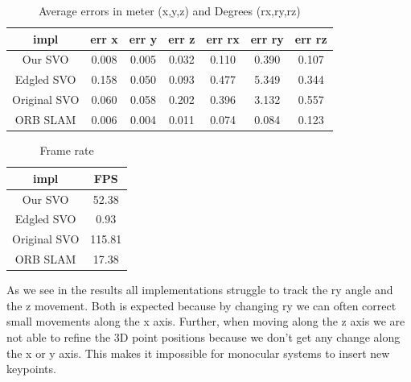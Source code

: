 \documentclass[11pt,a4paper,titlepage,oneside]{report}
\begin{document}
\begin{table}[H]
  \centering
  \begin{tabular}{|c|c|c|c|c|c|c|}
  impl & err x & err y & err z & err rx & err ry & err rz\\
  \hline
  Our SVO & 0.008 & 0.005 & 0.032 & 0.110 & 0.390 & 0.107\\
  Edgled SVO & 0.158 & 0.050 & 0.093 & 0.477 & 5.349 & 0.344\\
  Original SVO & 0.060 & 0.058 & 0.202 & 0.396 & 3.132 & 0.557\\
  ORB SLAM & 0.006 & 0.004 & 0.011 & 0.074 & 0.084 & 0.123
\end{tabular}

\caption{Average errors in meter (x,y,z) and Degrees (rx,ry,rz)}
\label{tab:average}
\end{table}

\begin{table}[H]
  \centering
  \begin{tabular}{|c|c|}
  impl & FPS\\
  \hline
  Our SVO & 52.38\\
  Edgled SVO & 0.93\\
  Original SVO & 115.81\\
  ORB SLAM & 17.38
\end{tabular}
\caption{Frame rate}
\label{tab:fps}
\end{table}

As we see in the results all implementations struggle to track the ry angle and the z movement. Both is expected because by changing ry we can often correct small movements along the x axis. Further, when moving along the z axis we are not able to refine the 3D point positions because we don't get any change along the x or y axis. This makes it impossible for monocular systems to insert new keypoints.
\end{document}
